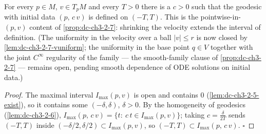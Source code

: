 \begin{lemma}
  \label{lem:dc-ch3-2-7-pointwise}
  \leanok
  For every $p\in M$, $v\in T_pM$ and every $T>0$ there is a $c>0$ such that
  the geodesic with initial data $(p,\,c\,v)$ is defined on $(-T,T)$. This is
  the pointwise-in-$(p,v)$ content of \cref{prop:dc-ch3-2-7}: shrinking the
  velocity extends the interval of definition. (The uniformity in the velocity
  over a ball $|v|\le r$ is now closed by \cref{lem:dc-ch3-2-7-vuniform}; the
  uniformity in the base point $q \in V$ together with the joint $C^\infty$
  regularity of the family — the smooth-family clause of
  \cref{prop:dc-ch3-2-7} — remains open, pending smooth dependence of ODE
  solutions on initial data.)
\end{lemma}
\begin{proof}
  \leanok
  The maximal interval $I_{\max}(p,v)$ is open and contains $0$
  (\cref{lem:dc-ch3-2-5-exist}), so it contains some $(-\delta,\delta)$,
  $\delta>0$. By the homogeneity of geodesics (\cref{lem:dc-ch3-2-6}),
  $I_{\max}(p,\,c\,v)=\{t:\ c\,t\in I_{\max}(p,v)\}$; taking
  $c=\frac{\delta}{2T}$ sends $(-T,T)$ inside $(-\delta/2,\delta/2)\subset
  I_{\max}(p,v)$, so $(-T,T)\subset I_{\max}(p,\,c\,v)$. $\square$
\end{proof}

